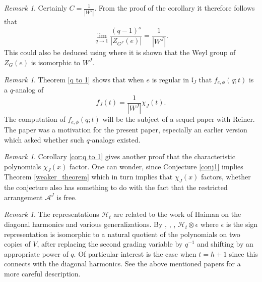 \documentclass[10pt]{amsart}
\newcommand{\levi}{\mathfrak l}
\renewcommand{\H}{{\mathcal{H}_t}}
\theoremstyle{plain}
\theoremstyle{definition}
\theoremstyle{remark}
\newtheorem{remark}[theorem]{Remark}
\begin{document}
\begin{remark}
Certainly $C=\frac{1}{|W^J|}$.  From the proof of the corollary it therefore follows that
$$\lim_{q \to 1} \frac{(q-1)^s}{|Z_{G^F}(e)|} = \frac{1}{|W^J|}.$$  This could also be deduced using \cite{brundan-goodwin:poly} where it
is shown that the Weyl group of $Z_{G}(e)$ is isomorphic to $W^J$.
\end{remark}


\begin{remark}
Theorem \ref{q to 1} shows that when $e$ is regular in $\levi_J$ that 
$f_{e, \phi}(q;t)$ is a $q$-analog of 
$$f_J(t) = \frac{1}{|W^J|} \chi_J(t).$$  The  computation of $f_{e, \phi}(q;t)$  will be the subject of a sequel paper with Reiner.  The paper \cite{bessis-reiner:cyclic} was a motivation for the present paper, especially an earlier version which asked whether such $q$-analogs existed.
\end{remark}

\begin{remark}
Corollary \ref{cor:q to 1} gives another proof that the characteristic polynomials $\chi_J(x)$ factor.
One can wonder, 
since Conjecture \ref{conj1} implies Theorem \ref{weaker_theorem} which in turn implies that $\chi_J(x)$ factors, 
whether the conjecture also has something to do with 
the fact that the restricted arrangement $\mathcal{A}^J$ is free.
\end{remark}

\begin{remark}
The representations $\H$ are related to the work of Haiman \cite{haiman:cdm} on the diagonal harmonics and various generalizations.  
By \cite{gordon:diagonal},  \cite{beg},  \cite{gordon-stafford}, 
$\H \otimes \epsilon$ where $\epsilon$ is the sign representation is isomorphic to a natural quotient of the polynomials on two copies of $V$, after 
replacing the second grading variable by $q^{-1}$
and shifting by an appropriate power of $q$.  Of particular interest is the case
when $t=h+1$ since this connects with the 
diagonal harmonics.    See the above mentioned papers for a more careful description.
\end{remark}
\end{document}
